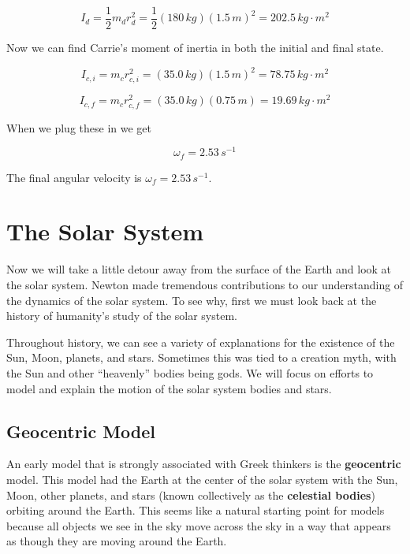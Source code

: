 \documentclass[12pt]{book}
\begin{document}
\begin{exampleblock}
\begin{equation}
I_d = \frac{1}{2} m_d r_d^2 = \frac{1}{2} (180 \, kg) (1.5 \, m)^2 = 202.5 \, kg \cdot m^2
\end{equation}

Now we can find Carrie's moment of inertia in both the initial and final state.

\begin{equation}
I_{c,i} = m_c r_{c,i}^2 = (35.0 \, kg)(1.5 \, m)^2 = 78.75 \, kg \cdot m^2
\end{equation}

\begin{equation}
I_{c,f} = m_c r_{c,f}^2 = (35.0 \, kg)(0.75 \, m) = 19.69 \, kg \cdot m^2
\end{equation}

When we plug these in we get

\begin{equation}
\omega_f = 2.53 \, s^{-1}
\end{equation}

The final angular velocity is $\omega_f = 2.53 \, s^{-1}$.

\end{exampleblock}

\chapter{The Solar System}
Now we will take a little detour away from the surface of the Earth and look at the solar system. Newton made tremendous contributions to our understanding of the dynamics of the solar system. To see why, first we must look back at the history of humanity's study of the solar system.

Throughout history, we can see a variety of explanations for the existence of the Sun, Moon, planets, and stars. Sometimes this was tied to a creation myth, with the Sun and other ``heavenly'' bodies being gods. We will focus on efforts to model and explain the motion of the solar system bodies and stars.

\section{Geocentric Model}

An early model that is strongly associated with Greek thinkers is the \textbf{geocentric} model. This model had the Earth at the center of the solar system with the Sun, Moon, other planets, and stars (known collectively as the \textbf{celestial bodies}) orbiting around the Earth. This seems like a natural starting point for models because all objects we see in the sky move across the sky in a way that appears as though they are moving around the Earth.
\end{document}
